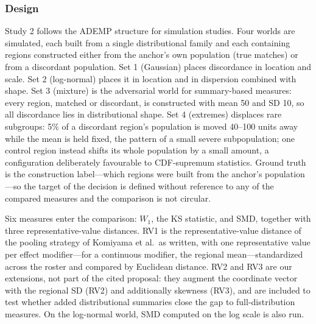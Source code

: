 \documentclass[AMA,Times1COL]{WileyNJDv5}
\begin{document}
\subsubsection{Design}\label{sec:study2_design}

Study 2 follows the ADEMP structure for simulation studies.\cite{morris2019} Four worlds are simulated, each built from a single distributional family and each containing regions constructed either from the anchor's own population (true matches) or from a discordant population. Set 1 (Gaussian) places discordance in location and scale. Set 2 (log-normal) places it in location and in dispersion combined with shape. Set 3 (mixture) is the adversarial world for summary-based measures: every region, matched or discordant, is constructed with mean 50 and SD 10, so all discordance lies in distributional shape. Set 4 (extremes) displaces rare subgroups: 5\% of a discordant region's population is moved 40--100 units away while the mean is held fixed, the pattern of a small severe subpopulation; one control region instead shifts its whole population by a small amount, a configuration deliberately favourable to CDF-supremum statistics. Ground truth is the construction label---which regions were built from the anchor's population---so the target of the decision is defined without reference to any of the compared measures and the comparison is not circular.

Six measures enter the comparison: $W_1$, the KS statistic, and SMD, together with three representative-value distances. RV1 is the representative-value distance of the pooling strategy of Komiyama et al.\ as written, with one representative value per effect modifier---for a continuous modifier, the regional mean---standardized across the roster and compared by Euclidean distance.\cite{komiyama2024} RV2 and RV3 are our extensions, not part of the cited proposal: they augment the coordinate vector with the regional SD (RV2) and additionally skewness (RV3), and are included to test whether added distributional summaries close the gap to full-distribution measures. On the log-normal world, SMD computed on the log scale is also run.
\end{document}

